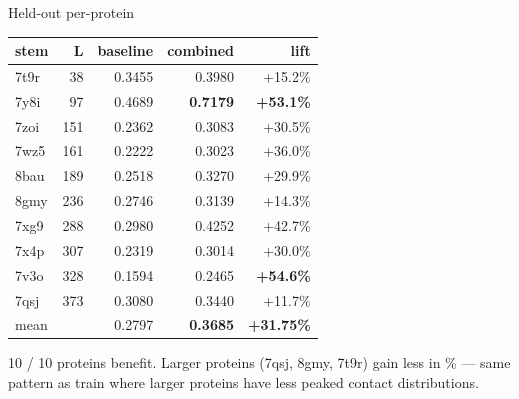 \documentclass[aspectratio=169,11pt]{beamer}
\begin{document}
\begin{frame}{Held-out per-protein}
  \begin{center}\small
    \begin{tabular}{lrrrr}
      \toprule
      stem & L & baseline & combined & lift \\
      \midrule
      7t9r &  38 & 0.3455 & 0.3980 & +15.2\% \\
      7y8i &  97 & 0.4689 & \textbf{0.7179} & \textbf{+53.1\%} \\
      7zoi & 151 & 0.2362 & 0.3083 & +30.5\% \\
      7wz5 & 161 & 0.2222 & 0.3023 & +36.0\% \\
      8bau & 189 & 0.2518 & 0.3270 & +29.9\% \\
      8gmy & 236 & 0.2746 & 0.3139 & +14.3\% \\
      7xg9 & 288 & 0.2980 & 0.4252 & +42.7\% \\
      7x4p & 307 & 0.2319 & 0.3014 & +30.0\% \\
      7v3o & 328 & 0.1594 & 0.2465 & \textbf{+54.6\%} \\
      7qsj & 373 & 0.3080 & 0.3440 & +11.7\% \\
      \midrule
      mean &     & 0.2797 & \textbf{0.3685} & \textbf{+31.75\%} \\
      \bottomrule
    \end{tabular}
  \end{center}
  \vspace{0.3em}
  {\footnotesize\color{navy}10 / 10 proteins benefit. Larger proteins
    (7qsj, 8gmy, 7t9r) gain less in \% — same pattern as train where
    larger proteins have less peaked contact distributions.}
\end{frame}
\end{document}
